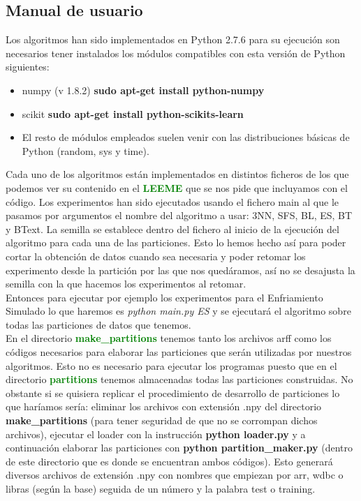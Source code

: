 \documentclass[10pt,a4paper]{article}
\begin{document}
\subsection{\color[rgb]{0.0,0.0,0.51}Manual de usuario}
Los algoritmos han sido implementados en Python 2.7.6 para su ejecución son necesarios tener instalados los módulos compatibles con esta versión de Python siguientes:\\

\begin{itemize}
\item numpy (v 1.8.2) \textbf{sudo apt-get install python-numpy}
\item scikit \textbf{sudo apt-get install python-scikits-learn}
\item El resto de módulos empleados suelen venir con las distribuciones básicas de Python (random, sys y time).
\end{itemize}

Cada uno de los algoritmos están implementados en distintos ficheros de los que podemos ver su contenido en el \textbf{\textcolor{green}{LEEME}} que se nos pide que incluyamos con el código. Los experimentos han sido ejecutados usando el fichero main al que le pasamos por argumentos el nombre del algoritmo a usar: 3NN, SFS, BL, ES, BT y BText. La semilla se establece dentro del fichero al inicio de la ejecución del algoritmo para cada una de las particiones. Esto lo hemos hecho así para poder cortar la obtención de datos cuando sea necesaria y poder retomar los experimento desde la partición por las que nos quedáramos, así no se desajusta la semilla con la que hacemos los experimentos al retomar.\\

Entonces para ejecutar por ejemplo los experimentos para el Enfriamiento Simulado lo que haremos es \textit{python main.py ES} y se ejecutará el algoritmo sobre todas las particiones de datos que tenemos.\\

En el directorio \textbf{\textcolor{green}{make\_partitions}} tenemos tanto los archivos arff como los códigos necesarios para elaborar las particiones que serán utilizadas por nuestros algoritmos. Esto no es necesario para ejecutar los programas puesto que en el directorio \textbf{\textcolor{green}{partitions}} tenemos almacenadas todas las particiones construidas. No obstante si se quisiera replicar el procedimiento de desarrollo de particiones lo que haríamos sería: eliminar los archivos con extensión .npy del directorio \textbf{make\_partitions} (para tener seguridad de que no se corrompan dichos archivos), ejecutar el loader con la instrucción \textbf{python loader.py} y a continuación elaborar las particiones con \textbf{python partition\_maker.py} (dentro de este directorio que es donde se encuentran ambos códigos). Esto generará diversos archivos de extensión .npy con nombres que empiezan por arr, wdbc o libras (según la base) seguida de un número y la palabra test o training.\\
\end{document}
